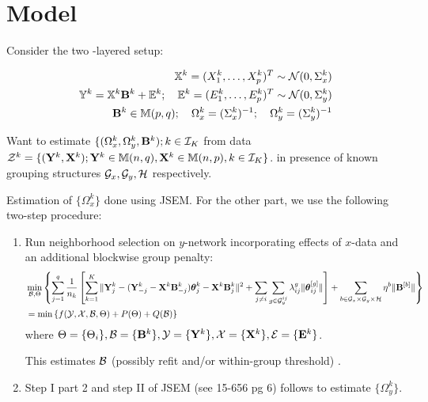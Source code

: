 \documentclass[12pt, letterpaper]{article}
\numberwithin{equation}{section}
\begin{document}
\section{Model}
Consider the two -layered setup:

\begin{eqnarray}
{\mathbb{X}}^k = (X^k_1, \ldots, X^k_p)^T \sim {\cal{N}} (0, \Sigma^k_x)\\
{\mathbb{Y}}^k = {\mathbb{X}}^k {\mathbf{B}}^k + {\mathbb{E}}^k; \quad {\mathbb{E}}^k = (E^k_1, \ldots, E^k_p)^T \sim {\cal{N}} (0, \Sigma^k_y)\\
{\mathbf{B}}^k \in {\mathbb{M}}(p,q); \quad \Omega^k_x = (\Sigma^k_x)^{-1}; \quad \Omega^k_y = (\Sigma^k_y)^{-1}
\end{eqnarray}

Want to estimate $\{ (\Omega^k_x, \Omega^k_y, {\mathbf{B}}^k); k \in {\cal{I}}_K$ from data ${\cal{Z}}^k = \{ ({\mathbf{Y}}^k, {\mathbf{X}}^k); {\mathbf{Y}}^k \in {\mathbb{M}}(n,q), {\mathbf{X}}^k \in {\mathbb{M}}(n,p), k \in {\cal{I}}_K\}$. in presence of known grouping structures ${\cal{G}}_x, {\cal{G}}_y, {\cal{H}}$ respectively. 


Estimation of $\{ \Omega_x^k \}$ done using JSEM. For the other part, we use the following two-step procedure:

\begin{enumerate}
\item Run neighborhood selection on $y$-network incorporating effects of $x$-data and an additional blockwise group penalty:
%
\begin{align}
& \min_{{\cal{B}}, \Theta} \left\{ \sum_{j=1}^q  \frac{1}{n_k} \left[ \sum_{k=1}^K \| {\mathbf{Y}}^k_j - ({\mathbf{Y}}_{-j}^k - {\mathbf{X}}^k {\mathbf{B}}_{-j}^k) {\boldsymbol{\theta}}_j^k - {\mathbf{X}}^k {\mathbf{B}}_j^k \|^2 + \sum_{j \neq i} \sum_{g \in {\cal{G}}_y^{ij}} \lambda_{ij}^g \| {\boldsymbol{\theta}}_{ij}^{[g]} \| \right] + \sum_{b \in {\cal{G}}_x \times {\cal{G}}_y \times {\cal{H}}} \eta^b \| {\mathbf{B}}^{[b]} \| \right\}\\
&= \min \left\{ f ( {\cal{Y}}, {\cal{X}}, {\cal{B}}, \Theta) + P (\Theta) + Q ({\cal{B}}) \right\} 
\end{align}
%
where $\Theta = \{ \Theta_i \}, {\cal{B}} = \{ {\mathbf{B}}^k \}, {\cal{Y}} = \{ {\mathbf{Y}}^k \}, {\cal{X}} = \{ {\mathbf{X}}^k \}, {\cal{E}} = \{ {\mathbf{E}}^k \}$.

This estimates ${\cal{B}}$ { \colrbf (possibly refit and/or within-group threshold) }.

\item Step I part 2 and step II of JSEM (see 15-656 pg 6) follows to estimate $\{ \Omega_y^k \}$.
\end{enumerate}
\end{document}
